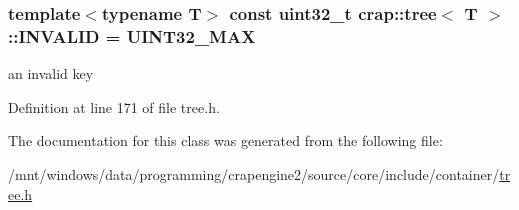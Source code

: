 \subsubsection[{I\+N\+V\+A\+L\+I\+D}]{\setlength{\rightskip}{0pt plus 5cm}template$<$typename T$>$ const uint32\+\_\+t {\bf crap\+::tree}$<$ T $>$\+::I\+N\+V\+A\+L\+I\+D = {\bf U\+I\+N\+T32\+\_\+\+M\+A\+X}\hspace{0.3cm}{\ttfamily [static]}}\label{classcrap_1_1tree_a798699e5ef5bc72a80797f8ca2d4a5fe}


an invalid key 



Definition at line 171 of file tree.\+h.



The documentation for this class was generated from the following file\+:\begin{DoxyCompactItemize}
\item 
/mnt/windows/data/programming/crapengine2/source/core/include/container/\hyperlink{tree_8h}{tree.\+h}\end{DoxyCompactItemize}
